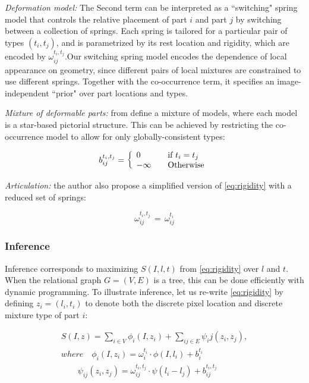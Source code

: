 \textit{Deformation model:} The Second term can be interpreted as a ``switching"
spring model that controls the relative placement of part $i$ and part $j$ by switching
between a collection of springs. Each spring is tailored for a particular pair of 
types $(t_i,t_j)$, and is parametrized by its rest location and rigidity, which are 
encoded by $\omega_{ij}^{t_i, t_j}$.Our switching spring model encodes the dependence
of local appearance on geometry, since different pairs of local mixtures are constrained
to use different springs. Together with the co-occurrence term, it specifies an
image-independent ``prior" over part locations and types.

\textit{Mixture of deformable parts: } from \citet{Felzenszwalb2010} define a mixture of models, where each model is a star-based pictorial structure. This can be achieved by restricting the
co-occurrence model to allow for only globally-consistent types:

\begin{equation}
b_{ij}^{t_i,t_j}=\left\{ 
  \begin{array}{l l}
	0 & \quad \text{if $t_i=t_j$}\\
    -\infty & \quad \text{Otherwise}
  \end{array} \right.
\end{equation}

\textit{Articulation: } the author also propose a simplified version of \ref{eq:rigidity}
with a reduced set of springs:

\begin{equation}
\omega_{ij}^{t_i,t_j}\,=\,\omega_{ij}^{t_i}
\end{equation}


\subsubsection{Inference}
Inference corresponds to maximizing $S(I,l,t)$ from \ref{eq:rigidity} over $l$ and $t$.
When the relational graph $G=(V,E)$ is a tree, this can be done efficiently with 
dynamic programming. To illustrate inference, let us re-write \ref{eq:rigidity} by
defining $z_i = (l_i,t_i)$ to denote both the discrete pixel location and discrete
mixture type of part $i$:

\begin{equation}
\begin{split}
S(I,z) = \sum_{i \in V} \phi_i(I,z_i) + \sum_{ij \in E} \psi_ij(z_i,z_j), \\
where \quad \phi_i(I,z_i) = \omega_i^{t_i} \cdot \phi(I,l_i) + b_i^{t_i} \\
\quad \quad \psi_{ij}(z_i,z_j)=\omega_{ij}^{t_i,t_j} \cdot \psi(l_i -l_j)+b_{ij}^{t_i,t_j}
\end{split}
\end{equation}

